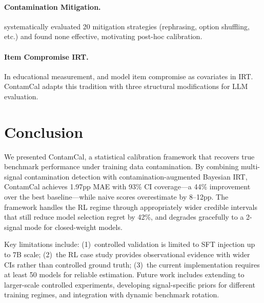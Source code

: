 \documentclass[11pt,letterpaper]{article}
\begin{document}
\paragraph{Contamination Mitigation.}
\citet{dong2024emperor} systematically evaluated 20 mitigation strategies (rephrasing, option shuffling, etc.) and found none effective, motivating post-hoc calibration.

\paragraph{Item Compromise IRT.}
In educational measurement, \citet{eckerly2017detecting} and \citet{sinharay2017detection} model item compromise as covariates in IRT.
ContamCal adapts this tradition with three structural modifications for LLM evaluation.

\section{Conclusion}

We presented ContamCal, a statistical calibration framework that recovers true benchmark performance under training data contamination.
By combining multi-signal contamination detection with contamination-augmented Bayesian IRT, ContamCal achieves 1.97pp MAE with 93\% CI coverage---a 44\% improvement over the best baseline---while naive scores overestimate by 8--12pp.
The framework handles the RL regime through appropriately wider credible intervals that still reduce model selection regret by 42\%, and degrades gracefully to a 2-signal mode for closed-weight models.

Key limitations include: (1)~controlled validation is limited to SFT injection up to 7B scale; (2)~the RL case study provides observational evidence with wider CIs rather than controlled ground truth; (3)~the current implementation requires at least 50 models for reliable estimation.
Future work includes extending to larger-scale controlled experiments, developing signal-specific priors for different training regimes, and integration with dynamic benchmark rotation.



\end{document}
